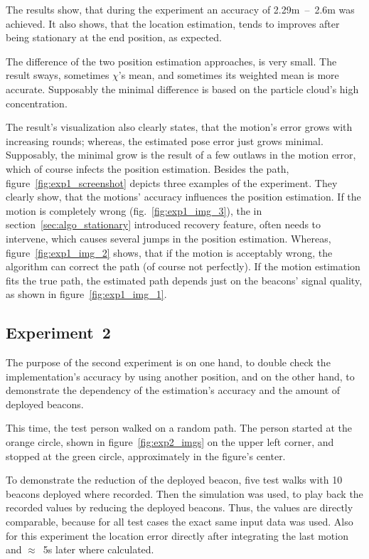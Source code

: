 The results show, that during the experiment an accuracy of 2.29m~--~2.6m was achieved. It also shows, that the location estimation, tends to improves after being stationary at the end position, as expected.

The difference of the two position estimation approaches, is very small. The result sways, sometimes $\chi$'s mean, and sometimes its weighted mean is more accurate. Supposably the minimal difference is based on the particle cloud's high concentration.

The result's visualization also clearly states, that the motion's error grows with increasing rounds; whereas, the estimated pose error just grows minimal. Supposably, the minimal grow is the result of a few outlaws in the motion error, which of course infects the position estimation. Besides the path, figure~\ref{fig:exp1_screenshot} depicts three examples of the experiment. They clearly show, that the motions' accuracy influences the position estimation. If the motion is completely wrong (fig.\ \ref{fig:exp1_img_3}), the in section~\ref{sec:algo_stationary} introduced recovery feature, often needs to intervene, which causes several jumps in the position estimation. Whereas, figure~\ref{fig:exp1_img_2} shows, that if the motion is acceptably wrong, the algorithm can correct the path (of course not perfectly). If the motion estimation fits the true path, the estimated path depends just on the beacons' signal quality, as shown in figure~\ref{fig:exp1_img_1}.

\subsection*{Experiment~2}
The purpose of the second experiment is on one hand, to double check the implementation's accuracy by using another position, and on the other hand, to demonstrate the dependency of the estimation's accuracy and the amount of deployed beacons.

This time, the test person walked on a random path. The person started at the orange circle, shown in figure~\ref{fig:exp2_imgs} on the upper left corner, and stopped at the green circle, approximately in the figure's center.

To demonstrate the reduction of the deployed beacon, five test walks with 10 beacons deployed where recorded. Then the simulation was used, to play back the recorded values by reducing the deployed beacons. Thus, the values are directly comparable, because for all test cases the exact same input data was used. Also for this experiment the location error directly after integrating the last motion and $\approx$~5s later where calculated.

